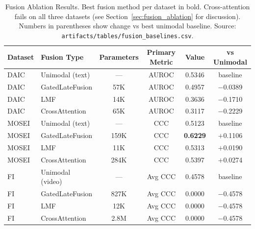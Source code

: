 \begin{table}[htbp]
\centering
\caption{Fusion Ablation Results. Best fusion method per dataset in bold. Cross-attention fails on all three datasets (see Section~\ref{sec:fusion_ablation} for discussion). Numbers in parentheses show change vs best unimodal baseline. Source: \texttt{artifacts/tables/fusion\_baselines.csv}.}
\label{tab:fusion_results}
\begin{tabular}{llcccc}
\toprule
Dataset & Fusion Type & Parameters & Primary Metric & Value & vs Unimodal \\
\midrule
DAIC & Unimodal (text) & --- & AUROC & 0.5346 & baseline \\
DAIC & GatedLateFusion & 57K & AUROC & 0.4957 & $-$0.0389 \\
DAIC & LMF & 14K & AUROC & 0.3636 & $-$0.1710 \\
DAIC & CrossAttention & 65K & AUROC & 0.3117 & $-$0.2229 \\[4pt]
MOSEI & Unimodal (text) & --- & CCC & 0.5123 & baseline \\
MOSEI & GatedLateFusion & 159K & CCC & \textbf{0.6229} & $+$0.1106 \\
MOSEI & LMF & 11K & CCC & 0.5313 & $+$0.0190 \\
MOSEI & CrossAttention & 284K & CCC & 0.5397 & $+$0.0274 \\[4pt]
FI & Unimodal (video) & --- & Avg CCC & 0.4578 & baseline \\
FI & GatedLateFusion & 827K & Avg CCC & 0.0000 & $-$0.4578 \\
FI & LMF & 12K & Avg CCC & 0.0000 & $-$0.4578 \\
FI & CrossAttention & 2.8M & Avg CCC & 0.0000 & $-$0.4578 \\
\bottomrule
\end{tabular}
\end{table}